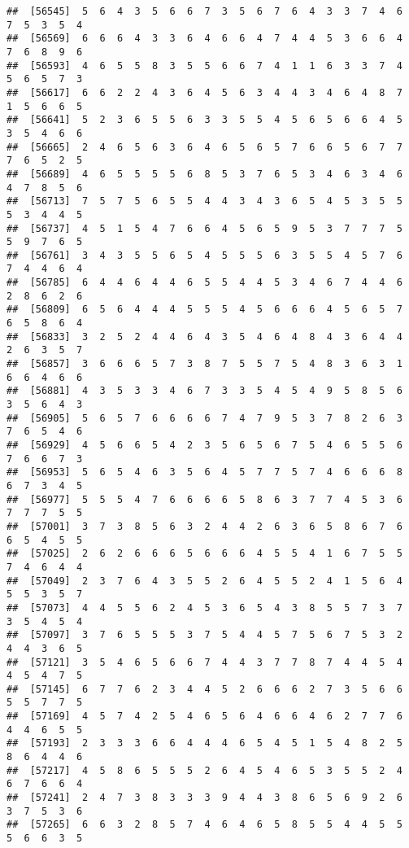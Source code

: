 \documentclass[
]{book}
\begin{document}
\begin{verbatim}
##  [56545]  5  6  4  3  5  6  6  7  3  5  6  7  6  4  3  3  7  4  6  7  5  3  5  4
##  [56569]  6  6  6  4  3  3  6  4  6  6  4  7  4  4  5  3  6  6  4  7  6  8  9  6
##  [56593]  4  6  5  5  8  3  5  5  6  6  7  4  1  1  6  3  3  7  4  5  6  5  7  3
##  [56617]  6  6  2  2  4  3  6  4  5  6  3  4  4  3  4  6  4  8  7  1  5  6  6  5
##  [56641]  5  2  3  6  5  5  6  3  3  5  5  4  5  6  5  6  6  4  5  3  5  4  6  6
##  [56665]  2  4  6  5  6  3  6  4  6  5  6  5  7  6  6  5  6  7  7  7  6  5  2  5
##  [56689]  4  6  5  5  5  5  6  8  5  3  7  6  5  3  4  6  3  4  6  4  7  8  5  6
##  [56713]  7  5  7  5  6  5  5  4  4  3  4  3  6  5  4  5  3  5  5  5  3  4  4  5
##  [56737]  4  5  1  5  4  7  6  6  4  5  6  5  9  5  3  7  7  7  5  5  9  7  6  5
##  [56761]  3  4  3  5  5  6  5  4  5  5  5  6  3  5  5  4  5  7  6  7  4  4  6  4
##  [56785]  6  4  4  6  4  4  6  5  5  4  4  5  3  4  6  7  4  4  6  2  8  6  2  6
##  [56809]  6  5  6  4  4  4  5  5  5  4  5  6  6  6  4  5  6  5  7  6  5  8  6  4
##  [56833]  3  2  5  2  4  4  6  4  3  5  4  6  4  8  4  3  6  4  4  2  6  3  5  7
##  [56857]  3  6  6  6  5  7  3  8  7  5  5  7  5  4  8  3  6  3  1  6  6  4  6  6
##  [56881]  4  3  5  3  3  4  6  7  3  3  5  4  5  4  9  5  8  5  6  3  5  6  4  3
##  [56905]  5  6  5  7  6  6  6  6  7  4  7  9  5  3  7  8  2  6  3  7  6  5  4  6
##  [56929]  4  5  6  6  5  4  2  3  5  6  5  6  7  5  4  6  5  5  6  7  6  6  7  3
##  [56953]  5  6  5  4  6  3  5  6  4  5  7  7  5  7  4  6  6  6  8  6  7  3  4  5
##  [56977]  5  5  5  4  7  6  6  6  6  5  8  6  3  7  7  4  5  3  6  7  7  7  5  5
##  [57001]  3  7  3  8  5  6  3  2  4  4  2  6  3  6  5  8  6  7  6  6  5  4  5  5
##  [57025]  2  6  2  6  6  6  5  6  6  6  4  5  5  4  1  6  7  5  5  7  4  6  4  4
##  [57049]  2  3  7  6  4  3  5  5  2  6  4  5  5  2  4  1  5  6  4  5  5  3  5  7
##  [57073]  4  4  5  5  6  2  4  5  3  6  5  4  3  8  5  5  7  3  7  3  5  4  5  4
##  [57097]  3  7  6  5  5  5  3  7  5  4  4  5  7  5  6  7  5  3  2  4  4  3  6  5
##  [57121]  3  5  4  6  5  6  6  7  4  4  3  7  7  8  7  4  4  5  4  4  5  4  7  5
##  [57145]  6  7  7  6  2  3  4  4  5  2  6  6  6  2  7  3  5  6  6  5  5  7  7  5
##  [57169]  4  5  7  4  2  5  4  6  5  6  4  6  6  4  6  2  7  7  6  4  4  6  5  5
##  [57193]  2  3  3  3  6  6  4  4  4  6  5  4  5  1  5  4  8  2  5  8  6  4  4  6
##  [57217]  4  5  8  6  5  5  5  2  6  4  5  4  6  5  3  5  5  2  4  6  7  6  6  4
##  [57241]  2  4  7  3  8  3  3  3  9  4  4  3  8  6  5  6  9  2  6  3  7  5  3  6
##  [57265]  6  6  3  2  8  5  7  4  6  4  6  5  8  5  5  4  4  5  5  5  6  6  3  5

\end{verbatim}
\end{document}
